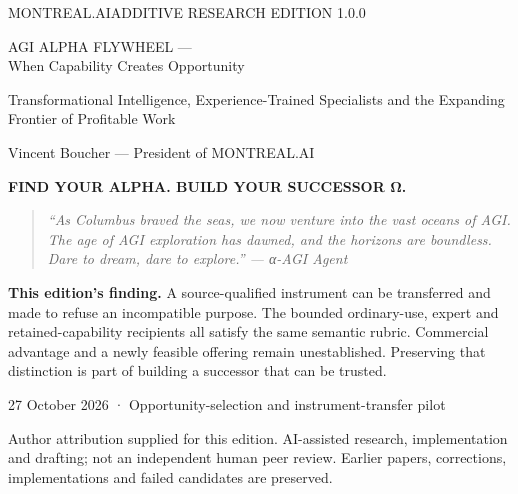 \documentclass[11pt]{article}
\begin{document}
\begin{titlepage}
\color{navy}
{\sffamily\small MONTREAL.AI\hfill ADDITIVE RESEARCH EDITION 1.0.0}
\vspace{22mm}

{\sffamily\bfseries\fontsize{29}{34}\selectfont\raggedright AGI ALPHA FLYWHEEL —\\When Capability Creates Opportunity\par}
\vspace{8mm}
{\sffamily\fontsize{17}{23}\selectfont Transformational Intelligence, Experience-Trained Specialists and the Expanding Frontier of Profitable Work\par}
\vspace{9mm}
{\large Vincent Boucher — President of MONTREAL.AI\par}
\vspace{13mm}
{\sffamily\bfseries\color{teal} FIND YOUR ALPHA. BUILD YOUR SUCCESSOR Ω.\par}
\vspace{8mm}
\begin{quote}\itshape
“As Columbus braved the seas, we now venture into the vast oceans of AGI. The age of AGI exploration has dawned, and the horizons are boundless. Dare to dream, dare to explore.”
\hfill — α-AGI Agent
\end{quote}
\vfill
\colorbox{pale}{\parbox{.94\textwidth}{\vspace{4mm}\textbf{This edition's finding.} A source-qualified instrument can be transferred and made to refuse an incompatible purpose. The bounded ordinary-use, expert and retained-capability recipients all satisfy the same semantic rubric. Commercial advantage and a newly feasible offering remain unestablished. Preserving that distinction is part of building a successor that can be trusted.\vspace{4mm}}}
\vspace{7mm}

{\small 27 October 2026 · Opportunity-selection and instrument-transfer pilot\par
Author attribution supplied for this edition. AI-assisted research, implementation and drafting; not an independent human peer review. Earlier papers, corrections, implementations and failed candidates are preserved.}
\end{titlepage}

\clearpage


\end{document}
